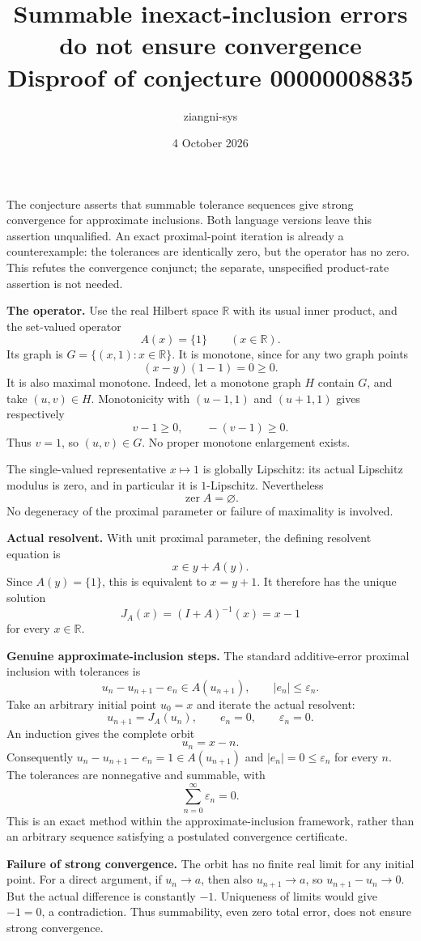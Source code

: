 \documentclass[11pt,a4paper]{article}
\title{Summable inexact-inclusion errors do not ensure convergence\\
\large Disproof of conjecture 00000008835}
\author{ziangni-sys}
\date{4 October 2026}
\begin{document}
\maketitle
The conjecture asserts that summable tolerance sequences give
strong convergence for approximate inclusions. Both language
versions leave this assertion unqualified.
An exact proximal-point iteration is already a counterexample:
the tolerances are identically zero, but the operator has no zero.
This refutes the convergence conjunct; the separate, unspecified
product-rate assertion is not needed.

\textbf{The operator.}
Use the real Hilbert space $\mathbb R$ with its usual inner product,
and the set-valued operator
\[
 A(x)=\{1\}\qquad(x\in\mathbb R).
\]
Its graph is $G=\{(x,1):x\in\mathbb R\}$.
It is monotone, since for any two graph points
\[
 (x-y)(1-1)=0\geq0.
\]
It is also maximal monotone. Indeed, let a monotone graph $H$
contain $G$, and take $(u,v)\in H$. Monotonicity with
$(u-1,1)$ and $(u+1,1)$ gives respectively
\[
 v-1\geq0,\qquad -(v-1)\geq0.
\]
Thus $v=1$, so $(u,v)\in G$. No proper monotone enlargement exists.

The single-valued representative $x\mapsto1$ is globally
Lipschitz: its actual Lipschitz modulus is zero, and in particular
it is $1$-Lipschitz. Nevertheless
\[
 \operatorname{zer} A=\varnothing.
\]
No degeneracy of the proximal parameter or failure of maximality
is involved.

\textbf{Actual resolvent.}
With unit proximal parameter, the defining resolvent equation is
\[
 x\in y+A(y).
\]
Since $A(y)=\{1\}$, this is equivalent to $x=y+1$.
It therefore has the unique solution
\[
 J_A(x)=(I+A)^{-1}(x)=x-1
\]
for every $x\in\mathbb R$.

\newpage
\textbf{Genuine approximate-inclusion steps.}
The standard additive-error proximal inclusion with tolerances is
\[
 u_n-u_{n+1}-e_n\in A(u_{n+1}),\qquad
 |e_n|\leq\varepsilon_n .
\]
Take an arbitrary initial point $u_0=x$ and iterate the actual
resolvent:
\[
 u_{n+1}=J_A(u_n),\qquad e_n=0,\qquad\varepsilon_n=0.
\]
An induction gives the complete orbit
\[
 u_n=x-n.
\]
Consequently $u_n-u_{n+1}-e_n=1\in A(u_{n+1})$ and
$|e_n|=0\leq\varepsilon_n$ for every $n$.
The tolerances are nonnegative and summable, with
\[
 \sum_{n=0}^{\infty}\varepsilon_n=0.
\]
This is an exact method within the approximate-inclusion
framework, rather than an arbitrary sequence satisfying a
postulated convergence certificate.

\textbf{Failure of strong convergence.}
The orbit has no finite real limit for any initial point.
For a direct argument, if $u_n\to a$, then also $u_{n+1}\to a$,
so $u_{n+1}-u_n\to0$. But the actual difference is constantly
$-1$. Uniqueness of limits would give $-1=0$, a contradiction.
Thus summability, even zero total error, does not ensure strong
convergence.
\end{document}
